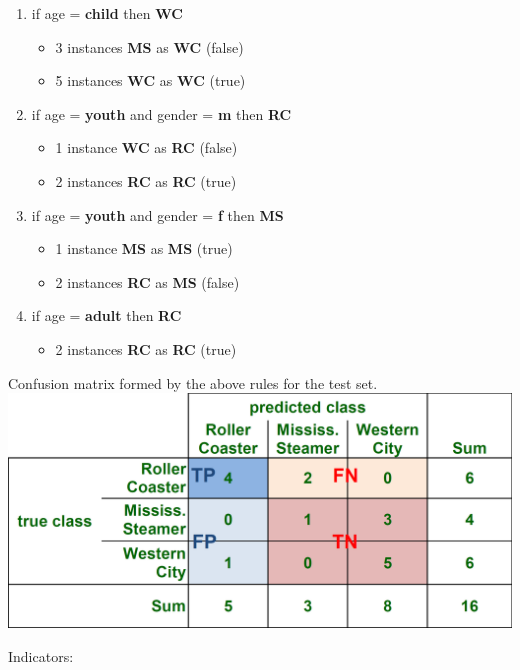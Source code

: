 \begin{breakbox}
\begin{enumerate}
	\item if age = \textbf{child} then \textbf{WC}
		\begin{itemize}
			\item 3 instances \textbf{MS} as \textbf{WC} (false)
			\item 5 instances \textbf{WC} as \textbf{WC} (true)
		\end{itemize}
	\item if age = \textbf{youth} and gender = \textbf{m} then \textbf{RC}
		\begin{itemize}
			\item 1 instance \textbf{WC} as \textbf{RC} (false)
			\item 2 instances \textbf{RC} as \textbf{RC} (true)
		\end{itemize}
	\item if age = \textbf{youth} and gender = \textbf{f} then \textbf{MS}
		\begin{itemize}
			\item 1 instance \textbf{MS} as \textbf{MS} (true)
			\item 2 instances \textbf{RC} as \textbf{MS} (false)
		\end{itemize}
	\item if age = \textbf{adult} then \textbf{RC}
		\begin{itemize}
			\item 2 instances \textbf{RC} as \textbf{RC} (true)
		\end{itemize}
\end{enumerate}

Confusion matrix formed by the above rules for the test set.
\includegraphics[width=.16\textwidth]{slides_images/confusion_matrix_theme_park}

Indicators:


\end{breakbox}
